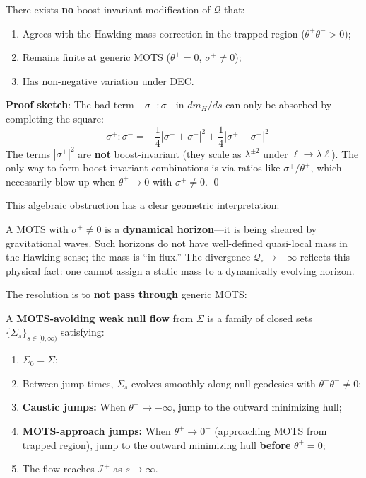 \begin{remark}
\begin{theorem}
\label{thm:gap2-algebraic}
There exists \textbf{no} boost-invariant modification of $\mathcal{Q}$ that:
\begin{enumerate}[label=(\roman*)]
\item Agrees with the Hawking mass correction in the trapped region ($\theta^+\theta^- > 0$);
\item Remains finite at generic MOTS ($\theta^+ = 0$, $\sigma^+ \neq 0$);
\item Has non-negative variation under DEC.
\end{enumerate}
\end{theorem}

\textbf{Proof sketch}: The bad term $-\sigma^+:\sigma^-$ in $dm_H/ds$ can only be absorbed by completing the square:
$$-\sigma^+:\sigma^- = -\frac{1}{4}|\sigma^+ + \sigma^-|^2 + \frac{1}{4}|\sigma^+ - \sigma^-|^2$$
The terms $|\sigma^\pm|^2$ are \textbf{not} boost-invariant (they scale as $\lambda^{\pm 2}$ under $\ell \to \lambda\ell$). The only way to form boost-invariant combinations is via ratios like $\sigma^+/\theta^+$, which necessarily blow up when $\theta^+ \to 0$ with $\sigma^+ \neq 0$. \qed
\end{remark}

This algebraic obstruction has a clear geometric interpretation:

\begin{remark}
A MOTS with $\sigma^+ \neq 0$ is a \textbf{dynamical horizon}---it is being sheared by gravitational waves. Such horizons do not have well-defined quasi-local mass in the Hawking sense; the mass is ``in flux.'' The divergence $\mathcal{Q}_\epsilon \to -\infty$ reflects this physical fact: one cannot assign a static mass to a dynamically evolving horizon.
\end{remark}

The resolution is to \textbf{not pass through} generic MOTS:

\begin{definition}
\label{def:mots-avoiding-flow}
A \textbf{MOTS-avoiding weak null flow} from $\Sigma$ is a family of closed sets $\{\Sigma_s\}_{s \in [0, \infty)}$ satisfying:
\begin{enumerate}[label=\textbf{(WA\arabic*)}]
\item $\Sigma_0 = \Sigma$;
\item Between jump times, $\Sigma_s$ evolves smoothly along null geodesics with $\theta^+\theta^- \neq 0$;
\item \textbf{Caustic jumps:} When $\theta^+ \to -\infty$, jump to the outward minimizing hull;
\item \textbf{MOTS-approach jumps:} When $\theta^+ \to 0^-$ (approaching MOTS from trapped region), jump to the outward minimizing hull \textbf{before} $\theta^+ = 0$;
\item The flow reaches $\mathscr{I}^+$ as $s \to \infty$.
\end{enumerate}
\end{definition}

